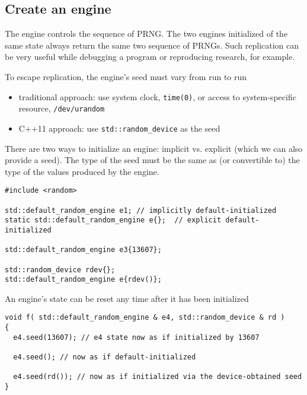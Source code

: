\subsection{Create an engine}

The engine controls the sequence of PRNG.
The two engines initialized of the same state always return the same two sequence of PRNGs.
Such replication can be very useful while debugging a program or reproducing research, for example.

To escape replication, the engine's seed must vary from run to run
\begin{itemize}
  \item traditional approach: use system clock, \verb!time(0)!, or access to system-specific resource, \verb!/dev/urandom!
  
  \item C++11 approach: use \verb!std::random_device! as the seed
\end{itemize}

There are two ways to initialize an engine: implicit vs. explicit (which we can
also provide a seed). The type of the seed must be the same as (or convertible
to) the type of the values produced by the engine.


\begin{verbatim}
#include <random>

std::default_random_engine e1; // implicitly default-initialized
static std::default_random_engine e{};  // explicit default-initialized

std::default_random_engine e3{13607};

std::random_device rdev{};
std::default_random_engine e{rdev()};
\end{verbatim}

An engine's state can be reset any time after it has been initialized
\begin{lstlisting}
void f( std::default_random_engine & e4, std::random_device & rd )
{
  e4.seed(13607); // e4 state now as if initialized by 13607

  e4.seed(); // now as if default-initialized

  e4.seed(rd()); // now as if initialized via the device-obtained seed
}
\end{lstlisting}

